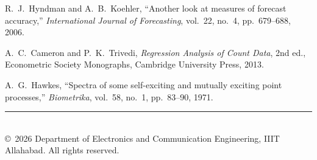 \documentclass[11pt,a4paper,oneside]{report}
\begin{document}
\begin{enumerate}[label={[\arabic*]},leftmargin=*]
  \item R.~J.~Hyndman and A.~B.~Koehler, ``Another look at measures of forecast accuracy,'' \textit{International Journal of Forecasting}, vol.~22, no.~4, pp.~679--688, 2006.
  \item A.~C.~Cameron and P.~K.~Trivedi, \textit{Regression Analysis of Count Data}, 2nd ed., Econometric Society Monographs, Cambridge University Press, 2013.
  \item A.~G.~Hawkes, ``Spectra of some self-exciting and mutually exciting point processes,'' \textit{Biometrika}, vol.~58, no.~1, pp.~83--90, 1971.
\end{enumerate}

\vspace{1cm}
\begin{center}
{\color{iiitablue}\rule{0.6\textwidth}{1pt}}\\[0.2cm]
{\small\textsf{\copyright~2026 Department of Electronics and Communication Engineering, IIIT Allahabad. All rights reserved.}}
\end{center}
\end{document}
